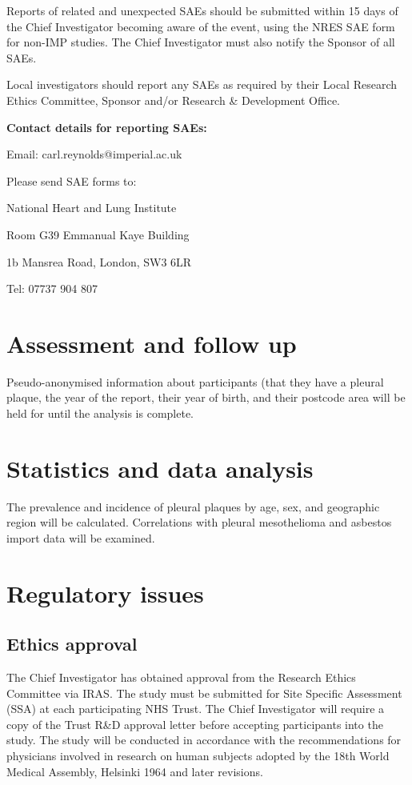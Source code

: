 \documentclass[a4paper,10pt]{article}
\begin{document}
Reports of related and unexpected SAEs should be submitted within 15 days of the Chief Investigator becoming aware of the event, using the NRES SAE form for non-IMP studies. The Chief Investigator must also notify the Sponsor of all SAEs.

Local investigators should report any SAEs as required by their Local Research Ethics Committee, Sponsor and/or Research \& Development Office.

\begin{center}
\textbf{Contact details for reporting SAEs:}
 
Email: carl.reynolds@imperial.ac.uk

Please send SAE forms to: 

National Heart and Lung Institute

Room G39 Emmanual Kaye Building

1b Mansrea Road, London, SW3 6LR 

Tel: 07737 904 807

\end{center}


\section{Assessment and follow up}
Pseudo-anonymised information about participants (that they have a pleural plaque, the year of the report, their year of birth, and their postcode area will be held for until the analysis is complete. 

\section{Statistics and data analysis}
The prevalence and incidence of pleural plaques by age, sex, and geographic region will be calculated. Correlations with pleural mesothelioma and asbestos import data will be examined.

\section{Regulatory issues}

\subsection{Ethics approval}
The Chief Investigator has obtained approval from the Research Ethics Committee via IRAS\@. The study must be submitted for Site Specific Assessment (SSA) at each participating NHS Trust. The Chief Investigator will require a copy of the Trust R\&D approval letter before accepting participants into the study. The study will be conducted in accordance with the recommendations for physicians involved in research on human subjects adopted by the 18th World Medical Assembly, Helsinki 1964 and later revisions.
\end{document}
